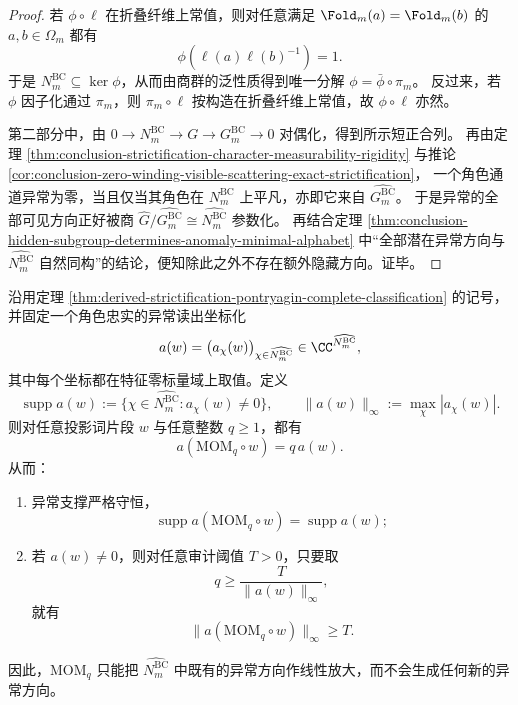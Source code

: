 \begin{proof}
若 \(\phi\circ\ell\) 在折叠纤维上常值，则对任意满足
\(
\Fold_m(a)=\Fold_m(b)
\)
的 \(a,b\in\Omega_m\) 都有
\[
\phi(\ell(a)\ell(b)^{-1})=1.
\]
于是 \(N_m^{\mathrm{BC}}\subseteq\ker\phi\)，从而由商群的泛性质得到唯一分解
\(
\phi=\bar\phi\circ\pi_m
\)。
反过来，若 \(\phi\) 因子化通过 \(\pi_m\)，则
\(
\pi_m\circ\ell
\)
按构造在折叠纤维上常值，故 \(\phi\circ\ell\) 亦然。

第二部分中，由 \(0\to N_m^{\mathrm{BC}}\to G\to G_m^{\mathrm{BC}}\to 0\) 对偶化，得到所示短正合列。
再由定理 \ref{thm:conclusion-strictification-character-measurability-rigidity}
与推论 \ref{cor:conclusion-zero-winding-visible-scattering-exact-strictification}，
一个角色通道异常为零，当且仅当其角色在 \(N_m^{\mathrm{BC}}\) 上平凡，亦即它来自
\(
\widehat{G_m^{\mathrm{BC}}}
\)。
于是异常的全部可见方向正好被商
\(
\widehat G/\widehat{G_m^{\mathrm{BC}}}\cong \widehat{N_m^{\mathrm{BC}}}
\)
参数化。
再结合定理
\ref{thm:conclusion-hidden-subgroup-determines-anomaly-minimal-alphabet}
中“全部潜在异常方向与 \(\widehat{N_m^{\mathrm{BC}}}\) 自然同构”的结论，便知除此之外不存在额外隐藏方向。证毕。
\end{proof}

\begin{proposition}\label{prop:derived-mom-support-conservation-threshold-reachability}
沿用定理 \ref{thm:derived-strictification-pontryagin-complete-classification}
的记号，并固定一个角色忠实的异常读出坐标化
\[
a(w)=\bigl(a_\chi(w)\bigr)_{\chi\in \widehat{N_m^{\mathrm{BC}}}}
\in \CC^{\widehat{N_m^{\mathrm{BC}}}},
\]
其中每个坐标都在特征零标量域上取值。定义
\[
\operatorname{supp}a(w)
:=
\{\chi\in \widehat{N_m^{\mathrm{BC}}}:a_\chi(w)\neq 0\},
\qquad
\|a(w)\|_\infty:=\max_{\chi}|a_\chi(w)|.
\]
则对任意投影词片段 \(w\) 与任意整数 \(q\ge 1\)，都有
\[
a(\mathrm{MOM}_q\circ w)=q\,a(w).
\]
从而：
\begin{enumerate}
\normalfont
  \item 异常支撑严格守恒，
  \[
  \operatorname{supp}a(\mathrm{MOM}_q\circ w)=\operatorname{supp}a(w);
  \]
  \item 若 \(a(w)\neq 0\)，则对任意审计阈值 \(T>0\)，只要取
  \[
  q\ge \frac{T}{\|a(w)\|_\infty},
  \]
  就有
  \[
  \|a(\mathrm{MOM}_q\circ w)\|_\infty\ge T.
  \]
\end{enumerate}
因此，\(\mathrm{MOM}_q\) 只能把
\(
\widehat{N_m^{\mathrm{BC}}}
\)
中既有的异常方向作线性放大，而不会生成任何新的异常方向。
\end{proposition}

